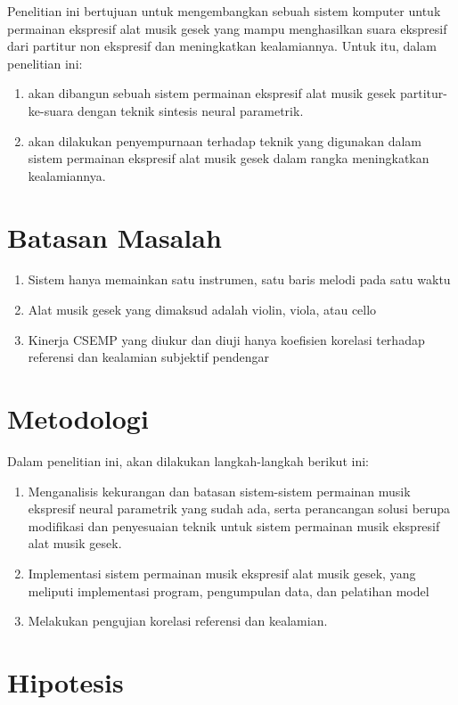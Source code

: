 Penelitian ini bertujuan untuk mengembangkan sebuah sistem komputer untuk permainan ekspresif alat musik gesek yang mampu menghasilkan suara ekspresif dari partitur non ekspresif dan meningkatkan kealamiannya. Untuk itu, dalam penelitian ini:
\begin{enumerate}
	\item akan dibangun sebuah sistem permainan ekspresif alat musik gesek partitur-ke-suara dengan teknik sintesis neural parametrik.
	\item akan dilakukan penyempurnaan terhadap teknik yang digunakan dalam sistem permainan ekspresif alat musik gesek dalam rangka meningkatkan kealamiannya.
\end{enumerate}

\section{Batasan Masalah}

\begin{enumerate}
	\item Sistem hanya memainkan satu instrumen, satu baris melodi pada satu waktu
	\item Alat musik gesek yang dimaksud adalah violin, viola, atau cello
	\item Kinerja CSEMP yang diukur dan diuji hanya koefisien korelasi terhadap referensi dan kealamian subjektif pendengar
\end{enumerate}

\section{Metodologi} \label{methodology}

Dalam penelitian ini, akan dilakukan langkah-langkah berikut ini:
\begin{enumerate}
	\item Menganalisis kekurangan dan batasan sistem-sistem permainan musik ekspresif neural parametrik yang sudah ada, serta perancangan solusi berupa modifikasi dan penyesuaian teknik untuk sistem permainan musik ekspresif alat musik gesek.
	\item Implementasi sistem permainan musik ekspresif alat musik gesek, yang meliputi implementasi program, pengumpulan data, dan pelatihan model
	\item Melakukan pengujian korelasi referensi dan kealamian.
\end{enumerate}

\section{Hipotesis}

